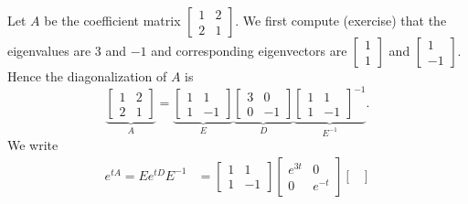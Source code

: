 \documentclass{ximera}
\begin{document}
\begin{example}
    Let $A$ be the coefficient matrix 
    $\left[ 
        \begin{smallmatrix}
            1 & 2 \\
            2 & 1
        \end{smallmatrix} 
    \right]$.
    We first compute (exercise) that the eigenvalues are 3 and $-1$ and corresponding eigenvectors are
    $\left[ \begin{smallmatrix} 1 \\ 1 \end{smallmatrix} \right]$ and
    $\left[ \begin{smallmatrix} 1 \\ -1 \end{smallmatrix} \right]$.
    Hence the diagonalization of $A$ is
    \begin{equation*}
        \underbrace{
        \begin{bmatrix}
            1 & 2 \\
            2 & 1
        \end{bmatrix}
        }_{A} =
        \underbrace{
        \begin{bmatrix}
            1 & 1 \\
            1 & -1
        \end{bmatrix}
        }_{E}
        \underbrace{
        \begin{bmatrix}
            3 & 0 \\
            0 & -1
        \end{bmatrix}
        }_{D}
        \underbrace{
        \begin{bmatrix}
            1 & 1 \\
            1 & -1
        \end{bmatrix}^{-1}
        }_{E^{-1}} .
    \end{equation*}
    We write
    \begin{equation*}
        \begin{split}
            e^{t A} = E e^{tD} E^{-1}
            & =
            \begin{bmatrix}
                1 & 1 \\
                1 & -1
            \end{bmatrix}
            \begin{bmatrix}
                e^{3t} & 0 \\
                0 & e^{-t}
            \end{bmatrix}
            \begin{bmatrix}

\end{bmatrix}
\end{split}
\end{equation*}
\end{example}
\end{document}
